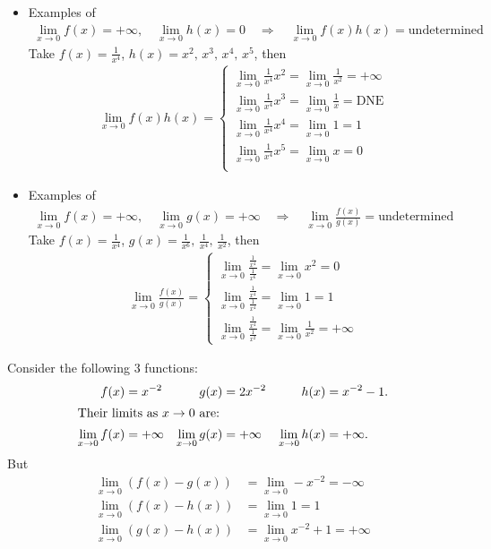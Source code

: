 \begin{itemize}
\item Examples of
\begin{align*}
\lim_{x \to 0} f(x) = +\infty, \quad \lim_{x \to 0} h(x) = 0\quad\Longrightarrow\quad\lim_{x \to 0} f(x) h(x) = \text{undetermined}
\end{align*}
Take $f(x) = \frac{1}{x^4}$, $h(x) = x^2,\,x^3,\,x^4,\,x^5$, then
\begin{align*}
\lim_{x \to 0} f(x) h(x) =
\begin{cases}
\displaystyle\lim_{x \to 0} \frac{1}{x^4} x^2 = \lim_{x \to 0} \frac{1}{x^2} = +\infty \\
\displaystyle\lim_{x \to 0} \frac{1}{x^4} x^3 = \lim_{x \to 0} \frac{1}{x} = \text{DNE}\\
\displaystyle\lim_{x \to 0} \frac{1}{x^4} x^4 = \lim_{x \to 0} 1 = 1                   \\
\displaystyle\lim_{x \to 0} \frac{1}{x^4} x^5 = \lim_{x \to 0} x = 0                   \\
\end{cases}
\end{align*}
\end{itemize}
\begin{itemize}
\item Examples of
\begin{align*}
\lim_{x \to 0} f(x) = +\infty, \quad \lim_{x \to 0} g(x) = +\infty\quad\Longrightarrow\quad\lim_{x \to 0} \frac{f(x)}{g(x)} = \text{undetermined}
\end{align*}
Take $f(x) = \frac{1}{x^4}$, $g(x) = \frac{1}{x^6},\,\frac{1}{x^4},\,\frac{1}{x^2}$, then
\begin{align*}
\lim_{x \to 0} \frac{f(x)}{g(x)} = \begin{cases}
\displaystyle\lim_{x \to 0}\frac{\frac{1}{x^4}}{\frac{1}{x^6}} = \lim_{x \to 0} x^2 = 0 \\
\displaystyle\lim_{x \to 0}\frac{\frac{1}{x^4}}{\frac{1}{x^4}} = \lim_{x \to 0} 1 = 1 \\
\displaystyle\lim_{x \to 0}\frac{\frac{1}{x^4}}{\frac{1}{x^2}} = \lim_{x \to 0} \frac{1}{x^2} = +\infty
\end{cases}
\end{align*}
\end{itemize}
\begin{eg}\label{eg_1_5_4}
Consider the following 3 functions:
\begin{align*}
f(x)&=x^{-2} & g(x)&=2x^{-2} &h(x)&=x^{-2}-1. \\
\intertext{Their limits as $x \to 0$ are:}
\lim_{x\to0} f(x) &= +\infty &
\lim_{x\to0} g(x) &= +\infty &
\lim_{x\to0} h(x) &= +\infty.
\end{align*}
But
\begin{align*}
\lim_{x\to0} \left( f(x)-g(x) \right) &= \lim_{x\to0} -x^{-2} = -\infty \\
\lim_{x\to0} \left( f(x)-h(x) \right) &= \lim_{x\to0} 1 = 1 \\
\lim_{x\to0} \left( g(x)-h(x) \right) &= \lim_{x\to0} x^{-2}+1 = +\infty
\end{align*}
\end{eg}
